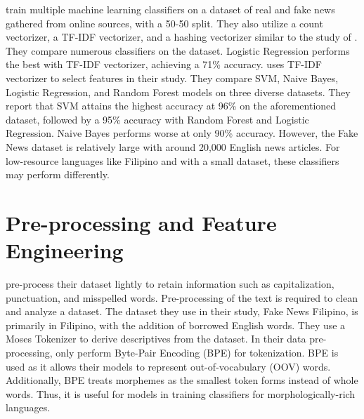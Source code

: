  train multiple machine learning classifiers on a dataset of real and fake news gathered from online sources, with a 50-50 split. They also utilize a count vectorizer, a TF-IDF vectorizer, and a hashing vectorizer similar to the study of . They compare numerous classifiers on the dataset. Logistic Regression performs the best with TF-IDF vectorizer, achieving a 71\% accuracy.  uses TF-IDF vectorizer to select features in their study. They compare SVM, Naive Bayes, Logistic Regression, and Random Forest models on three diverse datasets. They report that SVM attains the highest accuracy at 96\% on the aforementioned dataset, followed by a 95\% accuracy with Random Forest and Logistic Regression. Naive Bayes performs worse at only 90\% accuracy. However, the Fake News dataset is relatively large with around 20,000 English news articles. For low-resource languages like Filipino and with a small dataset, these classifiers may perform differently.

\section{Pre-processing and Feature Engineering}

 pre-process their dataset lightly to retain information such as capitalization, punctuation, and misspelled words. Pre-processing of the text is required to clean and analyze a dataset. The dataset they use in their study, Fake News Filipino, is primarily in Filipino, with the addition of borrowed English words. They use a Moses Tokenizer to derive descriptives from the dataset. In their data pre-processing,  only perform Byte-Pair Encoding (BPE) for tokenization. BPE is used as it allows their models to represent out-of-vocabulary (OOV) words. Additionally, BPE treats morphemes as the smallest token forms instead of whole words. Thus, it is useful for models in training classifiers for morphologically-rich languages.

